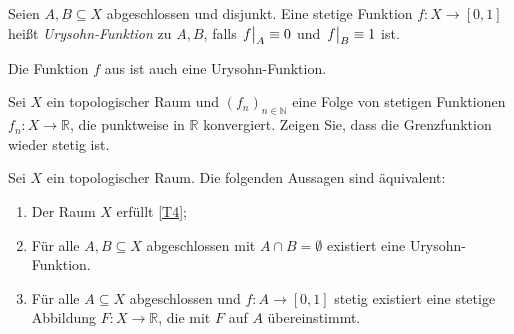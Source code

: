 \documentclass[
12pt, 
openany, 
a4paper, 
final,
fleqn, 
]{myclass}
\numberwithin{equation}{chapter}
\numberwithin{section}{chapter}
\newcommand{\NN}{\mathbb N}
\newcommand{\RR}{\mathbb R}
\newcommand{\eval}[1]{\left. \vphantom{\int}#1\right\lvert}
\newcommand{\TFAE}{Die folgenden Aussagen sind äquivalent}
\begin{document}
\begin{defn}\label{Urysohnfkt}
Seien $A, B\subseteq X$ abgeschlossen und disjunkt. Eine stetige Funktion $f: X\to [0,1]$ heißt \emph{Urysohn-Funktion} zu $A, B$, falls $\eval{f}_A\equiv 0$ und $\eval{f}_B\equiv 1$ ist.
\end{defn}

\begin{eg}
Die Funktion $f$ aus  ist auch eine Urysohn-Funktion.
\end{eg}
\begin{ex}
Sei $X$ ein topologischer Raum und $(f_n)_{n\in\NN}$ eine Folge von stetigen Funktionen $f_n: X\to \RR$, die punktweise in $\RR$ konvergiert. Zeigen Sie, dass die Grenzfunktion wieder stetig ist. 
\end{ex}

\begin{thr}\label{3.13}
Sei $X$ ein topologischer Raum. {\TFAE}: 
\begin{enumerate}[label=(\arabic*)]
\item\label{3.13, i} Der Raum $X$ erfüllt \ref{T4}; 
\item\label{3.13, ii} Für alle $A, B\subseteq X$ abgeschlossen mit $A\cap B = \emptyset$ existiert eine Urysohn-Funktion.
\item\label{3.13, iii} Für alle $A\subseteq X$ abgeschlossen und $f:A\to [0,1]$ stetig existiert eine stetige Abbildung $F: X \to \RR$, die mit $F$ auf $A$ übereinstimmt. 
\end{enumerate}
\end{thr}
\end{document}
